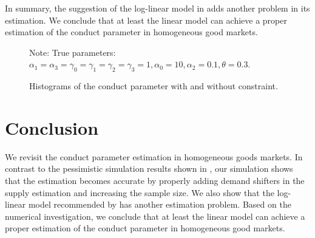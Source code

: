 \documentclass[11pt, a4paper]{article}
\begin{document}
In summary, the suggestion of the log-linear model in \cite{perloff2012collinearity} adds another problem in its estimation. 
We conclude that at least the linear model can achieve a proper estimation of the conduct parameter in homogeneous good markets. 



\begin{figure}[!htbp]
  \begin{center}
  \caption{Histograms of the conduct parameter with and without constraint.}
  \label{fg:histogram_loglinear_loglinear_with_constraint} 
  \end{center}
  \footnotesize
  Note: True parameters: $\alpha_1 = \alpha_3 = \gamma_0 = \gamma_1 = \gamma_2  = \gamma_3 = 1, \alpha_0 = 10, \alpha_2 = 0.1,  \theta = 0.3.$
\end{figure}




    
\section{Conclusion}
We revisit the conduct parameter estimation in homogeneous goods markets. In contrast to the pessimistic simulation results shown in \cite{perloff2012collinearity}, our simulation shows that the estimation becomes accurate by properly adding demand shifters in the supply estimation and increasing the sample size. We also show that the log-linear model recommended by \cite{perloff2012collinearity} has another estimation problem. Based on the numerical investigation, we conclude that at least the linear model can achieve a proper estimation of the conduct parameter in homogeneous good markets.




\end{document}
